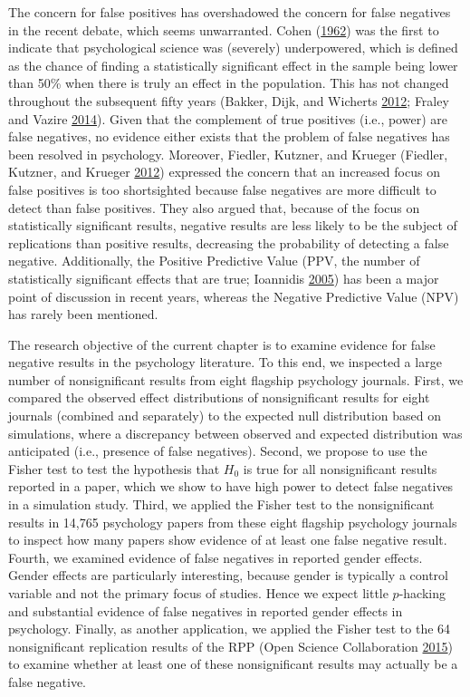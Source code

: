 \documentclass[a5paper]{book}
\begin{document}
The concern for false positives has overshadowed the concern for false
negatives in the recent debate, which seems unwarranted. Cohen
(\protect\hyperlink{ref-doi:10.1037ux2fh0045186}{1962}) was the first to
indicate that psychological science was (severely) underpowered, which
is defined as the chance of finding a statistically significant effect
in the sample being lower than 50\% when there is truly an effect in the
population. This has not changed throughout the subsequent fifty years
(Bakker, Dijk, and Wicherts
\protect\hyperlink{ref-doi:10.1177ux2f1745691612459060}{2012}; Fraley
and Vazire
\protect\hyperlink{ref-doi:10.1371ux2fjournal.pone.0109019}{2014}).
Given that the complement of true positives (i.e., power) are false
negatives, no evidence either exists that the problem of false negatives
has been resolved in psychology. Moreover, Fiedler, Kutzner, and Krueger
(Fiedler, Kutzner, and Krueger
\protect\hyperlink{ref-doi:10.1177ux2f1745691612462587}{2012}) expressed
the concern that an increased focus on false positives is too
shortsighted because false negatives are more difficult to detect than
false positives. They also argued that, because of the focus on
statistically significant results, negative results are less likely to
be the subject of replications than positive results, decreasing the
probability of detecting a false negative. Additionally, the Positive
Predictive Value (PPV, the number of statistically significant effects
that are true; Ioannidis
\protect\hyperlink{ref-doi:10.1371ux2fjournal.pmed.0020124}{2005}) has
been a major point of discussion in recent years, whereas the Negative
Predictive Value (NPV) has rarely been mentioned.

The research objective of the current chapter is to examine evidence for
false negative results in the psychology literature. To this end, we
inspected a large number of nonsignificant results from eight flagship
psychology journals. First, we compared the observed effect
distributions of nonsignificant results for eight journals (combined and
separately) to the expected null distribution based on simulations,
where a discrepancy between observed and expected distribution was
anticipated (i.e., presence of false negatives). Second, we propose to
use the Fisher test to test the hypothesis that \(H_0\) is true for all
nonsignificant results reported in a paper, which we show to have high
power to detect false negatives in a simulation study. Third, we applied
the Fisher test to the nonsignificant results in 14,765 psychology
papers from these eight flagship psychology journals to inspect how many
papers show evidence of at least one false negative result. Fourth, we
examined evidence of false negatives in reported gender effects. Gender
effects are particularly interesting, because gender is typically a
control variable and not the primary focus of studies. Hence we expect
little \(p\)-hacking and substantial evidence of false negatives in
reported gender effects in psychology. Finally, as another application,
we applied the Fisher test to the 64 nonsignificant replication results
of the RPP (Open Science Collaboration
\protect\hyperlink{ref-doi:10.1126ux2fscience.aac4716}{2015}) to examine
whether at least one of these nonsignificant results may actually be a
false negative.
\end{document}
